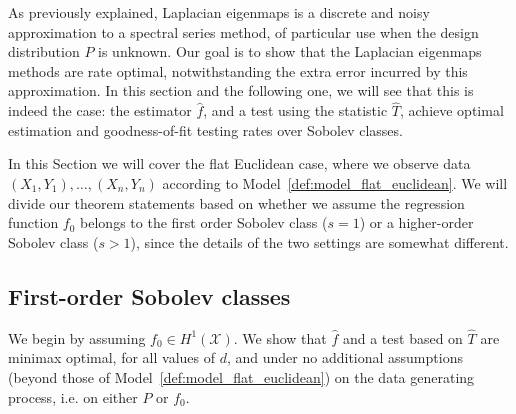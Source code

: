 \documentclass{article}
\newcommand{\1}{\mathbf{1}}
\newcommand{\mc}[1]{\mathcal{#1}}
\newcommand{\wh}[1]{\widehat{#1}}
\theoremstyle{alden}
\theoremstyle{aldenthm}
\theoremstyle{definition}
\theoremstyle{remark}
\begin{document}
As previously explained, Laplacian eigenmaps is a discrete and noisy approximation to a spectral series method, of particular use when the design distribution $P$ is unknown. Our goal is to show that the Laplacian eigenmaps methods are rate optimal, notwithstanding the extra error incurred by this approximation. In this section and the following one, we will see that this is indeed the case: the estimator $\wh{f}$, and a test using the statistic $\wh{T}$, achieve optimal estimation and goodness-of-fit testing rates over Sobolev classes. 

In this Section we will cover the flat Euclidean case, where we observe data $(X_1,Y_1),\ldots,(X_n,Y_n)$ according to Model~\ref{def:model_flat_euclidean}. We will divide our theorem statements based on whether we assume the regression function $f_0$ belongs to the first order Sobolev class ($s = 1$) or a higher-order Sobolev class ($s > 1$), since the details of the two settings are somewhat different.

\subsection{First-order Sobolev classes}
\label{sec:first_order_sobolev_classes}
We begin by assuming $f_0 \in H^1(\mc{X})$. We show that $\wh{f}$ and a test based on $\wh{T}$ are minimax optimal, for all values of $d$, and under no additional assumptions (beyond those of Model~\ref{def:model_flat_euclidean}) on the data generating process, i.e. on either $P$ or $f_0$.
\end{document}
